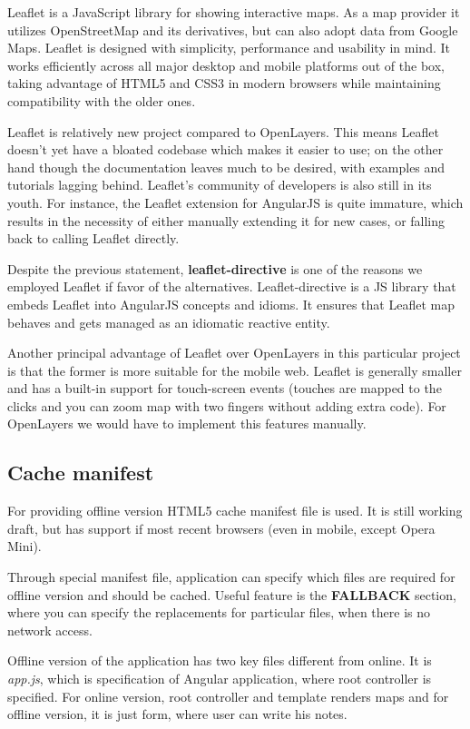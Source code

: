 \documentclass[12pt,a4paper]{article}
\begin{document}
Leaflet is a JavaScript library for showing interactive maps. As a map
provider it utilizes OpenStreetMap and its derivatives, but can also
adopt data from Google Maps. Leaflet is designed with simplicity,
performance and usability in mind. It works efficiently across all
major desktop and mobile platforms out of the box, taking advantage of
HTML5 and CSS3 in modern browsers while maintaining compatibility with
the older ones.

Leaflet is relatively new project compared to OpenLayers. This means
Leaflet doesn't yet have a bloated codebase which makes it easier to
use; on the other hand though the documentation leaves much to be
desired, with examples and tutorials lagging behind. Leaflet's
community of developers is also still in its youth. For instance, the
Leaflet extension for AngularJS is quite immature, which results in
the necessity of either manually extending it for new cases, or
falling back to calling Leaflet directly.

Despite the previous statement, \textbf{leaflet-directive} is one of
the reasons we employed Leaflet if favor of the alternatives.
Leaflet-directive is a JS library that embeds Leaflet into AngularJS
concepts and idioms. It ensures that Leaflet map behaves and gets
managed as an idiomatic reactive entity.

Another principal advantage of Leaflet over OpenLayers in this
particular project is that the former is more suitable for the mobile
web. Leaflet is generally smaller and has a built-in support for
touch-screen events (touches are mapped to the clicks and you can zoom
map with two fingers without adding extra code). For OpenLayers we
would have to implement this features manually.

\subsection{Cache manifest}
For providing offline version HTML5 cache manifest file is used. It is still working
draft, but has support if most recent browsers (even in mobile, except Opera Mini).

Through special manifest file, application can specify which files are required for
offline version and should be cached. Useful feature is the \textbf{FALLBACK} section,
where you can specify the replacements for particular files, when there is no network
access.

Offline version of the application has two key files different from online.
It is \textit{app.js}, which is specification of Angular application, where root
controller is specified. For online version, root controller and template renders maps
and for offline version, it is just form, where user can write his notes.
\end{document}
